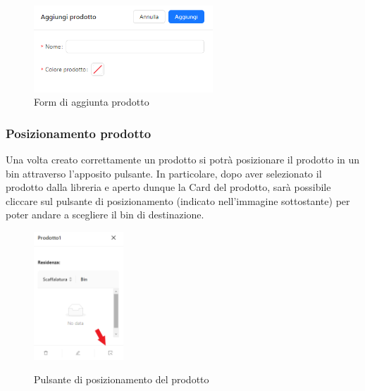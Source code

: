         \begin{figure}[H]
            \centering
            \includegraphics[width=0.6\textwidth]{images/creazione_prodotto.png}
            \caption{Form di aggiunta prodotto}
        \end{figure}

        \subsubsection{Posizionamento prodotto}\label{sec:prodotti:posizionamento}
        \noindent Una volta creato correttamente un prodotto si potrà posizionare il prodotto in un bin attraverso l'apposito pulsante.
        In particolare, dopo aver selezionato il prodotto dalla libreria e aperto dunque la Card del prodotto, sarà possibile cliccare sul pulsante di posizionamento (indicato nell'immagine sottostante) per poter andare a scegliere il bin di destinazione. 
        \begin{figure}[h!]
            \centering
            \includegraphics[width=0.3\textwidth]{images/tasto_posizionamento.png}
            \label{riposizionamento}
            \caption{Pulsante di posizionamento del prodotto}
        \end{figure}
        
